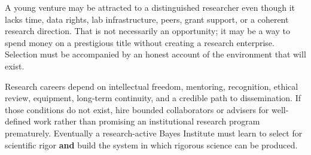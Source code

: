 A young venture may be attracted to a distinguished researcher even though it lacks time, data rights, lab infrastructure, peers, grant support, or a coherent research direction. That is not necessarily an opportunity; it may be a way to spend money on a prestigious title without creating a research enterprise. Selection must be accompanied by an honest account of the environment that will exist.

Research careers depend on intellectual freedom, mentoring, recognition, ethical review, equipment, long-term continuity, and a credible path to dissemination. If those conditions do not exist, hire bounded collaborators or advisers for well-defined work rather than promising an institutional research program prematurely. Eventually a research-active Bayes Institute must learn to select for scientific rigor \textbf{and} build the system in which rigorous science can be produced.
